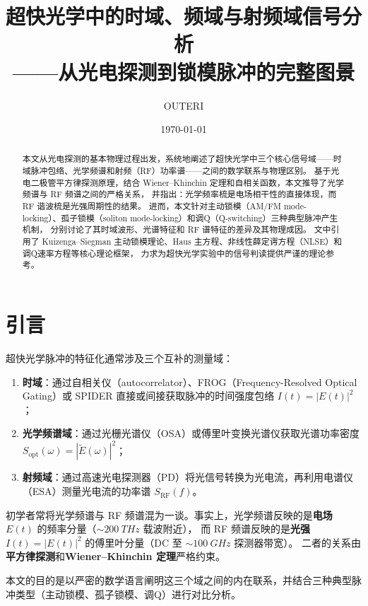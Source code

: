 \documentclass[11pt,a4paper]{article}
\title{\textbf{超快光学中的时域、频域与射频域信号分析}\\
\large ——从光电探测到锁模脉冲的完整图景}
\author{OUTERI}
\date{\today}
\begin{document}
\maketitle

\begin{abstract}
本文从光电探测的基本物理过程出发，系统地阐述了超快光学中三个核心信号域——时域脉冲包络、光学频谱和射频（RF）功率谱——之间的数学联系与物理区别。
基于光电二极管平方律探测原理，结合 Wiener--Khinchin 定理和自相关函数，本文推导了光学频谱与 RF 频谱之间的严格关系，
并指出：光学频率梳是电场相干性的直接体现，而 RF 谐波梳是光强周期性的结果。
进而，本文针对主动锁模（AM/FM mode-locking）、孤子锁模（soliton mode-locking）和调Q（Q-switching）三种典型脉冲产生机制，
分别讨论了其时域波形、光谱特征和 RF 谱特征的差异及其物理成因。
文中引用了 Kuizenga--Siegman 主动锁模理论、Haus 主方程、非线性薛定谔方程（NLSE）和调Q速率方程等核心理论框架，
力求为超快光学实验中的信号判读提供严谨的理论参考。
\end{abstract}

\tableofcontents

\section{引言}

超快光学脉冲的特征化通常涉及三个互补的测量域：
\begin{enumerate}[label=(\arabic*)]
    \item \textbf{时域}：通过自相关仪（autocorrelator）、FROG（Frequency-Resolved Optical Gating）或 SPIDER 直接或间接获取脉冲的时间强度包络 $I(t) = |E(t)|^2$；
    \item \textbf{光学频谱域}：通过光栅光谱仪（OSA）或傅里叶变换光谱仪获取光谱功率密度 $S_{\text{opt}}(\omega) = |\tilde{E}(\omega)|^2$；
    \item \textbf{射频域}：通过高速光电探测器（PD）将光信号转换为光电流，再利用电谱仪（ESA）测量光电流的功率谱 $S_{\text{RF}}(f)$。
\end{enumerate}

初学者常将光学频谱与 RF 频谱混为一谈。事实上，光学频谱反映的是\textbf{电场} $E(t)$ 的频率分量（$\sim\SI{200}{THz}$ 载波附近），
而 RF 频谱反映的是\textbf{光强} $I(t) = |E(t)|^2$ 的傅里叶分量（DC 至 $\sim\SI{100}{GHz}$ 探测器带宽）。
二者的关系由\textbf{平方律探测}和\textbf{Wiener--Khinchin 定理}严格约束。

本文的目的是以严密的数学语言阐明这三个域之间的内在联系，并结合三种典型脉冲类型（主动锁模、孤子锁模、调Q）进行对比分析。
\end{document}
